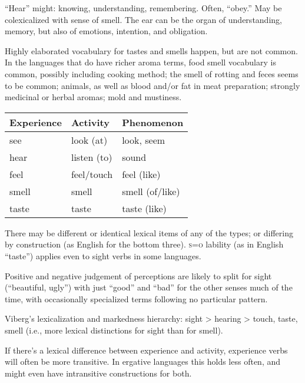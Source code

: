 \documentclass[11pt]{article}
\newcommand{\I}[1]{\textsc{#1}}   %
\begin{document}
{``Hear'' might: knowing, understanding, remembering.  Often, ``obey.''
May be colexicalized with sense of smell.  The ear can be the organ of
understanding, memory, but also of emotions, intention, and obligation.

Highly elaborated vocabulary for tastes and smells happen, but are not
common.  In the languages that do have richer aroma terms, food smell
vocabulary is common, possibly including cooking method; the smell of
rotting and feces seems to be common; animals, as well as blood and/or
fat in meat preparation; strongly medicinal or herbal aromas; mold and
mustiness.

\begin{center}
  \begin{tabular}{lll}
    Experience & Activity & Phenomenon \\
    \hline
    see & look (at) & look, seem \\
    hear & listen (to) & sound \\
    feel & feel/touch & feel (like) \\
    smell & smell & smell (of/like) \\
    taste & taste & taste (like)
  \end{tabular}
\end{center}

There may be different or identical lexical items of any of the types;
or differing by construction (as English for the bottom
three).  \I{s=o} lability (as in English ``taste'') applies even to
sight verbs in some languages.

Positive and negative judgement of perceptions are likely to split for
sight (``beautiful, ugly'') with just ``good'' and ``bad'' for the
other senses much of the time, with occasionally specialized terms
following no particular pattern.

Viberg's lexicalization and markedness hierarchy: sight > hearing >
touch, taste, smell (i.e., more lexical distinctions for sight than
for smell).


If there's a lexical difference between experience and activity,
experience verbs will often be more transitive.  In ergative
languages this holds less often, and might even have intransitive
constructions for both.

}
\end{document}
